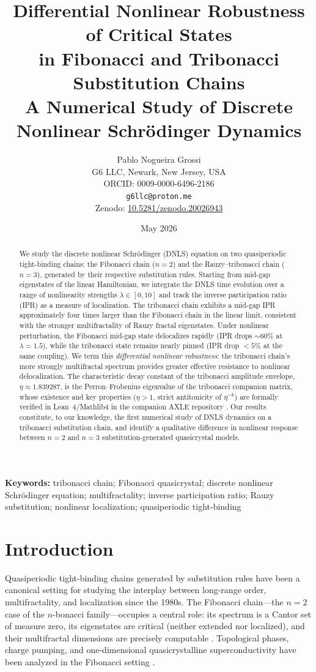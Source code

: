 \documentclass[12pt,a4paper]{article}
\title{\textbf{Differential Nonlinear Robustness of Critical States\\
in Fibonacci and Tribonacci Substitution Chains}\\[0.5em]
\large A Numerical Study of Discrete Nonlinear Schr\"{o}dinger Dynamics}
\author{Pablo Nogueira Grossi\\
G6 LLC, Newark, New Jersey, USA\\
ORCID: 0009-0000-6496-2186\\
\texttt{g6llc@proton.me}\\[0.3em]
\small Zenodo: \href{https://doi.org/10.5281/zenodo.20026943}{10.5281/zenodo.20026943}}
\date{May 2026}
\begin{document}
\maketitle

\begin{abstract}
We study the discrete nonlinear Schr\"{o}dinger (DNLS) equation on two
quasiperiodic tight-binding chains: the Fibonacci chain ($n=2$) and the
Rauzy--tribonacci chain ($n=3$), generated by their respective substitution
rules. Starting from mid-gap eigenstates of the linear Hamiltonian, we
integrate the DNLS time evolution over a range of nonlinearity strengths
$\lambda \in [0,10]$ and track the inverse participation ratio (IPR) as a
measure of localization. The tribonacci chain exhibits a mid-gap IPR
approximately four times larger than the Fibonacci chain in the linear limit,
consistent with the stronger multifractality of Rauzy fractal eigenstates.
Under nonlinear perturbation, the Fibonacci mid-gap state delocalizes rapidly
(IPR drops $\sim 60\%$ at $\lambda = 1.5$), while the tribonacci state
remains nearly pinned (IPR drop $< 5\%$ at the same coupling). We term this
\emph{differential nonlinear robustness}: the tribonacci chain's more
strongly multifractal spectrum provides greater effective resistance to
nonlinear delocalization. The characteristic decay constant of the
tribonacci amplitude envelope, $\eta \approx 1.839287$, is the
Perron--Frobenius eigenvalue of the tribonacci companion matrix, whose
existence and key properties ($\eta > 1$, strict antitonicity of $\eta^{-k}$)
are formally verified in Lean~4/Mathlib4 in the companion AXLE repository
\cite{AXLE2026}. Our results constitute, to our knowledge, the first
numerical study of DNLS dynamics on a tribonacci substitution chain, and
identify a qualitative difference in nonlinear response between $n=2$ and
$n=3$ substitution-generated quasicrystal models.
\end{abstract}

\textbf{Keywords:} tribonacci chain; Fibonacci quasicrystal; discrete
nonlinear Schr\"{o}dinger equation; multifractality; inverse participation
ratio; Rauzy substitution; nonlinear localization; quasiperiodic tight-binding

\section{Introduction}

Quasiperiodic tight-binding chains generated by substitution rules have been
a canonical setting for studying the interplay between long-range order,
multifractality, and localization since the 1980s. The Fibonacci chain---the
$n=2$ case of the $n$-bonacci family---occupies a central role: its spectrum
is a Cantor set of measure zero, its eigenstates are critical (neither
extended nor localized), and their multifractal dimensions are precisely
computable \cite{Kohmoto1983,Ostlund1983,Luck1989,Mace2017}. Topological
phases, charge pumping, and one-dimensional quasicrystalline superconductivity
have been analyzed in the Fibonacci setting \cite{Kraus2012,Lang2012}.
\end{document}
